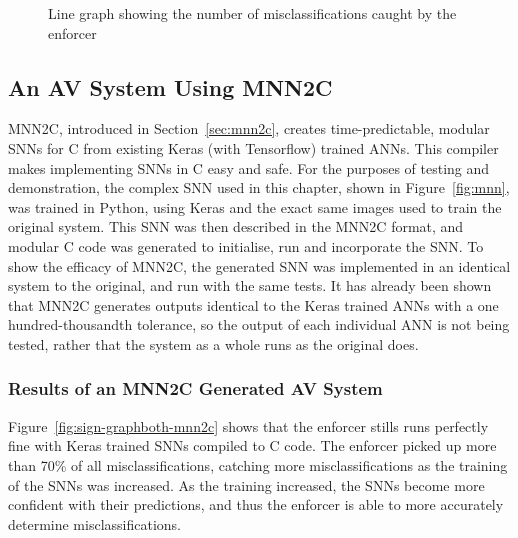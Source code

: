 
\begin{figure}[t]
	\centering
	\scalebox{0.9}{}
	\caption{Line graph showing the number of misclassifications caught by the enforcer \label{fig:sign-graphboth}}
\end{figure}


\subsection{An \ac{AV} System Using \acf{MNN2C}}
\ac{MNN2C}, introduced in Section~\ref{sec:mnn2c}, creates time-predictable, modular \acfp{SNN} for C from existing Keras (with Tensorflow) trained \acp{ANN}. 
This compiler makes implementing \acfp{SNN} in C easy and safe.
For the purposes of testing and demonstration, the complex \ac{SNN} used in this chapter, shown in Figure~\ref{fig:mnn}, was trained in Python, using Keras and the exact same images used to train the original system.
This \ac{SNN} was then described in the \ac{MNN2C} format, and modular C code was generated to initialise, run and incorporate the \ac{SNN}.
To show the efficacy of \ac{MNN2C}, the generated \ac{SNN} was implemented in an identical system to the original, and run with the same tests. 
It has already been shown that \ac{MNN2C} generates outputs identical to the Keras trained \acp{ANN} with a one hundred-thousandth tolerance, so the output of each individual \ac{ANN} is not being tested, rather that the system as a whole runs as the original does.

\subsubsection{Results of an \ac{MNN2C} Generated \ac{AV} System}
Figure~\ref{fig:sign-graphboth-mnn2c} shows that the enforcer stills runs perfectly fine with Keras trained \acp{SNN} compiled to C code.
The enforcer picked up more than 70\% of all misclassifications, catching more misclassifications as the training of the \acp{SNN} was increased. 
As the training increased, the \acp{SNN} become more confident with their predictions, and thus the enforcer is able to more accurately determine misclassifications.

